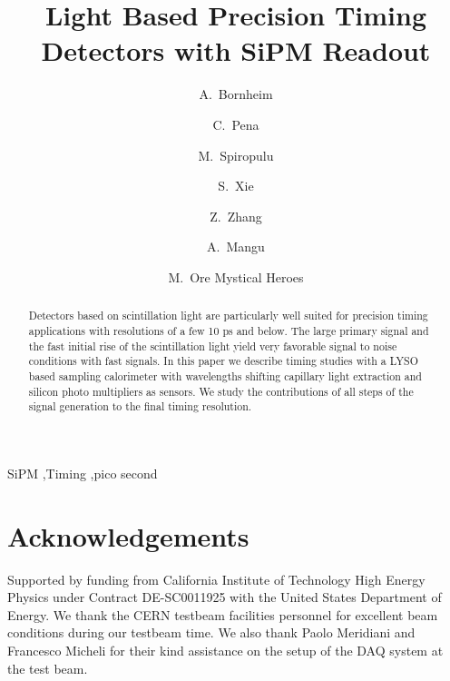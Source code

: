 \documentclass[preprint,1p]{elsarticle}
\begin{document}
  
\linenumbers

\begin{frontmatter}

\title{Light Based Precision Timing Detectors with SiPM Readout}

\author[1]{A.~Bornheim}
\author[1]{C.~Pena}
\author[1]{M.~Spiropulu}
\author[1]{S.~Xie}
\author[1]{Z.~Zhang}
\author[1]{A.~Mangu}
\author[1]{M.~Ore Mystical Heroes }
\address[1]{California Institute of Technology, Pasadena, CA, USA}


\begin{abstract}
Detectors based on scintillation light are particularly well suited for precision timing applications with 
resolutions of a few 10 ps and below. The large primary signal and the fast initial rise of the scintillation
light yield very favorable signal to noise conditions with fast signals. In this paper we describe timing 
studies with a LYSO based sampling calorimeter with wavelengths shifting capillary light extraction and silicon
photo multipliers as sensors. We study the contributions of all steps of the signal generation to 
the final timing resolution. 
\end{abstract}

\begin{keyword}
SiPM \sep Timing \sep pico second
\end{keyword}

\end{frontmatter}

%
%

%
%
  
%
%
  
%
%
  
%
%
  
%
%
  
%
%

\section{Acknowledgements} 
Supported by funding from California Institute of Technology High Energy Physics
under Contract DE-SC0011925 with the United States Department of Energy. We
thank the CERN testbeam facilities personnel for excellent beam conditions 
during our testbeam time. We also thank Paolo Meridiani and Francesco Micheli
for their kind assistance on the setup of the DAQ system at the test beam.
%
%
\end{document}
